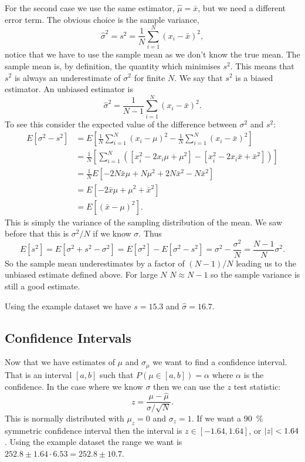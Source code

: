 \documentclass[a4paper]{article}
\begin{document}
    For the second case we use the same estimator, \(\hat{\mu} = \bar{x}\), but we need a different error term.
    The obvious choice is the sample variance, 
    \[\hat{\sigma}^2 = s^2 = \frac{1}{N}\sum_{i=1}^{N}(x_i - \bar{x})^2,\]
    notice that we have to use the sample mean as we don't know the true mean.
    The sample mean is, by definition, the quantity which minimises \(s^2\).
    This means that \(s^2\) is always an underestimate of \(\sigma^2\) for finite \(N\).
    We say that \(s^2\) is a biased estimator.
    An unbiased estimator is
    \[\hat{\sigma}^2 = \frac{1}{N - 1}\sum_{i=1}^{N}(x_i - \bar{x})^2.\]
    To see this consider the expected value of the difference between \(\sigma^2\) and \(s^2\):
    \begin{align*}
        E[\sigma^2 - s^2] &= E\left[\frac{1}{N}\sum_{i=1}^{N} (x_i - \mu)^2 - \frac{1}{N}\sum_{i=1}^{N} (x_i - \bar{x})^2\right]\\
        &= \frac{1}{N}\left[\sum_{i=1}^{N}([x_i^2 - 2x_i\mu + \mu^2] - [x_i^2 - 2x_i\bar{x} + \bar{x}^2])\right]\\
        &= \frac{1}{N}E[-2N\bar{x}\mu + N\mu^2 + 2N\bar{x}^2 - N\bar{x}^2]\\
        &= E[-2\bar{x}\mu + \mu^2 + \bar{x}^2]\\
        &= E[(\bar{x} - \mu)^2].
    \end{align*}
    This is simply the variance of the sampling distribution of the mean.
    We saw before that this is \(\sigma^2/N\) if we know \(\sigma\).
    Thus
    \[E[s^2] = E[\sigma^2 + s^2 - \sigma^2] = E[\sigma^2] - E[\sigma^2 - s^2] = \sigma^2 - \frac{\sigma^2}{N} = \frac{N - 1}{N}\sigma^2.\]
    So the sample mean underestimates by a factor of \((N-1)/N\) leading us to the unbiased estimate defined above.
    For large \(N\) \(N\approx N - 1\) so the sample variance is still a good estimate.
    
    Using the example dataset we have \(s = 15.3\) and \(\hat{\sigma} = 16.7\).
    
    \subsection{Confidence Intervals}
    Now that we have estimates of \(\mu\) and \(\sigma_\mu\) we want to find a confidence interval.
    That is an interval \([a, b]\) such that \(P(\mu\in[a, b]) = \alpha\) where \(\alpha\) is the confidence.
    In the case where we know \(\sigma\) then we can use the \(z\) test statistic:
    \[z = \frac{\mu - \hat{\mu}}{\sigma/\sqrt{N}}.\]
    This is normally distributed with \(\mu_z = 0\) and \(\sigma_z = 1\).
    If we want a \SI{90}{\percent} symmetric confidence interval then the interval is \(z\in[-1.64, 1.64]\), or \(\abs{z} < 1.64\) .
    Using the example dataset the range we want is \(252.8 \pm 1.64\cdot 6.53 = 252.8 \pm 10.7\).
    
\end{document}
